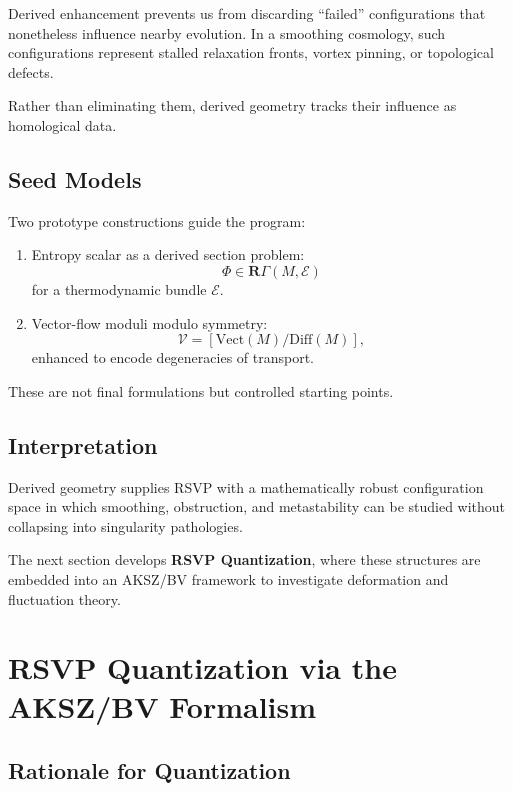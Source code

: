 \documentclass[12pt]{article}
\begin{document}
Derived enhancement prevents us from discarding ``failed'' configurations that nonetheless influence nearby evolution. In a smoothing cosmology, such configurations represent stalled relaxation fronts, vortex pinning, or topological defects.

Rather than eliminating them, derived geometry tracks their influence as homological data.

\subsection{Seed Models}

Two prototype constructions guide the program:

\begin{enumerate}
\item Entropy scalar as a derived section problem:
\[
\Phi \in \mathbf{R}\Gamma(M,\mathcal{E})
\]
for a thermodynamic bundle $\mathcal{E}$.

\item Vector-flow moduli modulo symmetry:
\[
\mathcal{V} = [\mathrm{Vect}(M)/\mathrm{Diff}(M)],
\]
enhanced to encode degeneracies of transport.
\end{enumerate}

These are not final formulations but controlled starting points.

\subsection{Interpretation}

Derived geometry supplies RSVP with a mathematically robust configuration space in which smoothing, obstruction, and metastability can be studied without collapsing into singularity pathologies.

\bigskip

The next section develops \textbf{RSVP Quantization}, where these structures are embedded into an AKSZ/BV framework to investigate deformation and fluctuation theory.

\section{RSVP Quantization via the AKSZ/BV Formalism}

\subsection{Rationale for Quantization}
\end{document}

